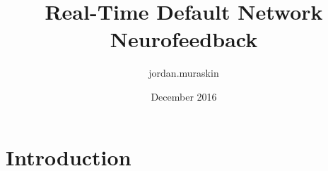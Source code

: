 \documentclass{article}
\title{Real-Time Default Network Neurofeedback}
\author{jordan.muraskin }
\date{December 2016}
\begin{document}
\maketitle

\section{Introduction}
\end{document}
